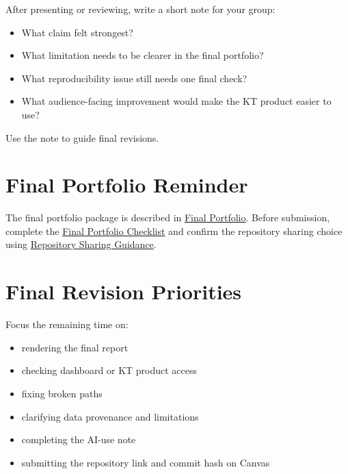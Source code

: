 \documentclass[
  letterpaper,
  DIV=11,
  numbers=noendperiod,
  oneside]{scrreprt}
\providecommand{\tightlist}{%
  \setlength{\itemsep}{0pt}\setlength{\parskip}{0pt}}
\begin{document}

After presenting or reviewing, write a short note for your group:

\begin{itemize}
\tightlist
\item
  What claim felt strongest?
\item
  What limitation needs to be clearer in the final portfolio?
\item
  What reproducibility issue still needs one final check?
\item
  What audience-facing improvement would make the KT product easier to
  use?
\end{itemize}

Use the note to guide final revisions.

\section*{Final Portfolio Reminder}\label{final-portfolio-reminder}


The final portfolio package is described in
\href{../../milestones/final-portfolio/README.md}{Final Portfolio}.
Before submission, complete the
\href{../../milestones/final-portfolio/final-portfolio-checklist.md}{Final
Portfolio Checklist} and confirm the repository sharing choice using
\href{../../milestones/final-portfolio/repository-sharing-guidance.md}{Repository
Sharing Guidance}.

\section*{Final Revision Priorities}\label{final-revision-priorities}


Focus the remaining time on:

\begin{itemize}
\tightlist
\item
  rendering the final report
\item
  checking dashboard or KT product access
\item
  fixing broken paths
\item
  clarifying data provenance and limitations
\item
  completing the AI-use note
\item
  submitting the repository link and commit hash on Canvas
\end{itemize}
\end{document}
